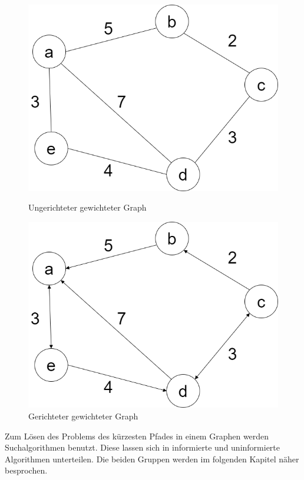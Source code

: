 \begin{figure}[!tbp]
	\centering
	\begin{minipage}[b]{0.45\textwidth}
		\includegraphics[width=\linewidth]{images/undirGraph.png}
		\caption{Ungerichteter gewichteter Graph}
		\label{fig:undirGraph}
	\end{minipage}
	\hfill
	\begin{minipage}[b]{0.45\textwidth}
		\includegraphics[width=\linewidth]{images/dirGraph.png}
		\caption{Gerichteter gewichteter Graph}
		\label{fig:dirGraph}
	\end{minipage}
\end{figure}





Zum Lösen des Problems des kürzesten Pfades in einem Graphen werden Suchalgorithmen benutzt. Diese lassen sich in informierte und uninformierte Algorithmen unterteilen. Die beiden Gruppen werden im folgenden Kapitel näher besprochen.

